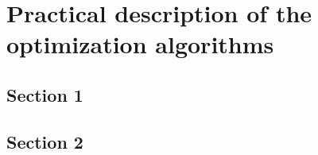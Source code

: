 \chapter{Practical description of the optimization algorithms}

\section{Section 1}

\section{Section 2}
